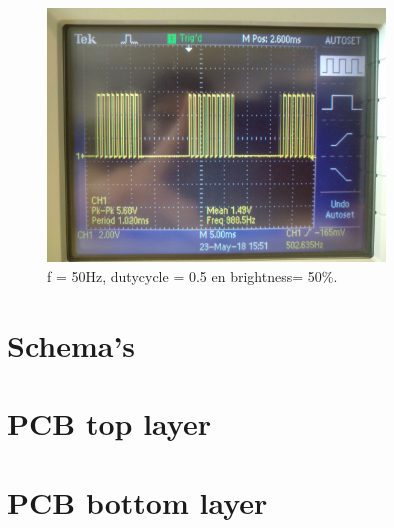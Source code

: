 \documentclass[a4paper,dutch]{article}
\begin{document}
\begin{appendices}
\begin{figure}[H]
\centering
\includegraphics[width=0.8\textwidth]{osc-pwm.jpg}
\caption{\label{fig:zerze}f = 50Hz, dutycycle = 0.5 en brightness= 50\%.}
\end{figure}

\pagebreak

\section{Schema's}
\label{appendix:schema}


\section{PCB top layer}
\label{appendix:top}


\section{PCB bottom layer}
\label{appendix:bot}


\pagebreak


\end{appendices}
\end{document}
